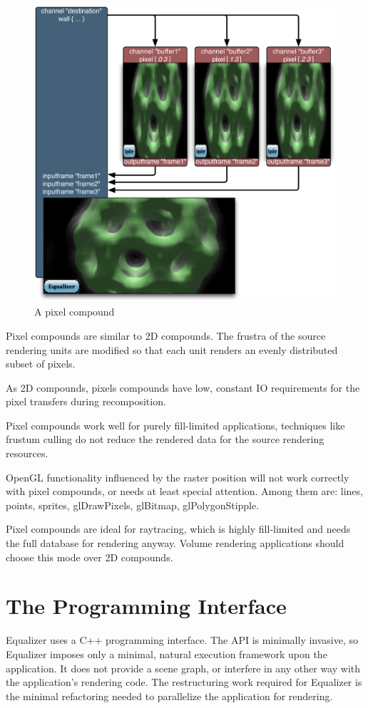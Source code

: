 \documentclass[10pt,a4]{scrartcl}
\begin{document}
\begin{figure}
  \includegraphics[width=.618\textwidth]{images/Pixel.pdf}
  {\caption{\small A pixel compound}}
\end{figure}
Pixel compounds are similar to 2D compounds. The frustra of the
source rendering units are modified so that each unit renders an evenly
distributed subset of pixels. 

As 2D compounds, pixels compounds have low, constant IO requirements for
the pixel transfers during recomposition.

Pixel compounds work well for purely fill-limited applications,
techniques like frustum culling do not reduce the rendered data for the
source rendering resources.

OpenGL functionality influenced by the raster position will not work
correctly with pixel compounds, or needs at least special
attention. Among them are: lines, points, sprites, glDrawPixels,
glBitmap, glPolygonStipple.

Pixel compounds are ideal for raytracing, which is highly fill-limited
and needs the full database for rendering anyway. Volume rendering
applications should choose this mode over 2D compounds.



\section{The Programming Interface}

Equalizer uses a C++ programming interface. The API is minimally
invasive, so Equalizer imposes only a minimal, natural execution
framework upon the application. It does not provide a scene graph, or
interfere in any other way with the application's rendering code. The
restructuring work required for Equalizer is the minimal refactoring
needed to parallelize the application for rendering.
\end{document}
